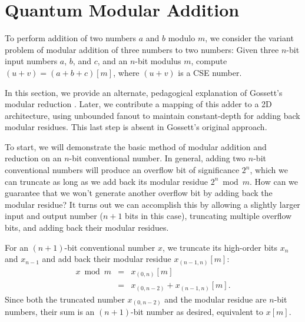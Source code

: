 \documentclass[twoside]{article}
\begin{document}
%
\section{Quantum Modular Addition}
\label{sec:csa-mod-add}

To perform addition of two numbers $a$ and $b$ modulo $m$,
we consider the variant problem of modular addition of three numbers to
two numbers:
%
Given three $n$-bit input numbers $a$, $b$, and $c$, and an $n$-bit modulus $m$,
compute
$(u+v) = (a+b+c)[m]$,
where $(u+v)$ is a CSE number.

In this section, we provide an alternate, pedagogical explanation of
Gossett's modular reduction \cite{Gossett1998}. Later, we contribute a mapping of this adder
to a 2D architecture,
using unbounded fanout to maintain constant-depth for adding back
modular residues. This last step is absent in Gossett's original approach.

To start, we will demonstrate the basic method of modular addition and reduction
on an $n$-bit conventional number. In general, adding two $n$-bit conventional
numbers will produce an overflow bit of significance $2^n$, which we can truncate as long as
we add back its modular residue $2^n \bmod m$. How can we guarantee that we won't
generate another overflow bit by adding back the modular residue? It turns out
we can accomplish this by allowing
a slightly larger input and output number ($n+1$ bits in this case), truncating
multiple overflow bits, and adding back their modular residues.

For an $(n+1)$-bit conventional number $x$,
we truncate its high-order bits $x_n$ and $x_{n-1}$
and
add back their modular residue $x_{(n-1,n)}[m]$:
%
\begin{eqnarray}
x \bmod m &=& x_{(0,n)}[m] \nonumber \\
&=& x_{(0,n-2)} + x_{(n-1,n)}[m].
\end{eqnarray}
%
Since both the truncated number $x_{(0,n-2)}$ and the modular residue
are $n$-bit numbers, their sum is an $(n+1)$-bit number as desired, equivalent
to $x[m]$.
\end{document}

